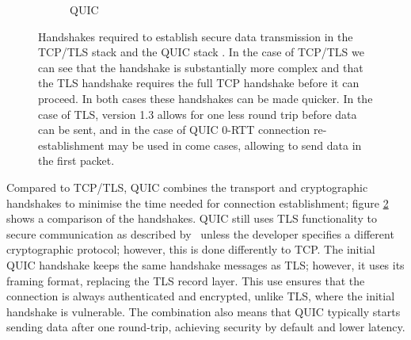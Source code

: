\begin{figure}[ht]
\begin{center}
\begin{subfigure}[b]{0.45\textwidth}
            \caption{QUIC}
            \label{fig:handshakes:quic}
        \end{subfigure}
        \caption{Handshakes required to establish secure data transmission in the TCP/TLS stack  and the QUIC stack . In the case of TCP/TLS we can see that the handshake is substantially more complex and that the TLS handshake requires the full TCP handshake before it can proceed. In both cases these handshakes can be made quicker. In the case of TLS, version 1.3 allows for one less round trip before data can be sent, and in the case of QUIC 0-RTT connection re-establishment may be used in come cases, allowing to send data in the first packet.}
        \label{fig:handshakes_comparison}
    \end{center}
\end{figure}

Compared to TCP/TLS, QUIC combines the transport and cryptographic handshakes to minimise the time needed for connection establishment; figure \ref{fig:handshakes_comparison} shows a comparison of the handshakes.
QUIC still uses TLS functionality to secure communication as described by~\citet{thomson_using_2021} unless the developer specifies a different cryptographic protocol; however, this is done differently to TCP.
The initial QUIC handshake keeps the same handshake messages as TLS; however, it uses its framing format, replacing the TLS record layer.
This use ensures that the connection is always authenticated and encrypted, unlike TLS, where the initial handshake is vulnerable.
The combination also means that QUIC typically starts sending data after one round-trip, achieving security by default and lower latency.
